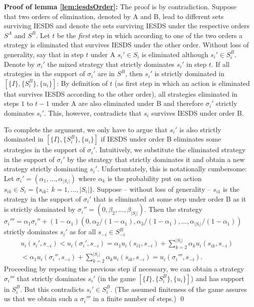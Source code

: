 \documentclass[a4paper,11pt]{article}
\begin{document}

\textbf{Proof of lemma \ref{lem:iesdsOrder}: }
The proof is by contradiction. Suppose that two orders of elimination, denoted by A and B, lead to different sets surviving IESDS and denote the sets surviving IESDS under the respective orders $S^A$ and $S^B$. Let $t$ be the \emph{first} step in which according to one of the two orders a strategy is eliminated that survives IESDS under the other order. Without loss of generality, say that in step $t$ under A $s_i'\in S_i$ is eliminated although $s_i'\in S_i^B$. Denote by $\sigma_i'$ the mixed strategy that strictly dominates $s_i'$ in step $t$. If all strategies in the support of $\sigma_i'$ are in $S^B$, then $s_i'$ is strictly dominated in $\left[\{I\},\{S_i^B\},\{u_i\}\right]$: By definition of $t$ (as first step in which an action is eliminated that survives IESDS according to the other order), all strategies eliminated in steps $1$ to $t-1$ under A are also eliminated under B and therefore $\sigma_i'$ strictly dominates $s_i'$. This, however, contradicts that $s_i$ survives IESDS under order B.

To complete the argument, we only have to argue that $s_i'$ is also strictly dominated in $\left[\{I\},\{S_i^B\},\{u_i\}\right]$ if IESDS under order B eliminates some strategies in the support of $\sigma_i'$. Intuitively, we substitute the eliminated strategy in the support of $\sigma_i'$ by the strategy that strictly dominates it and obtain a new strategy strictly dominating $s_i'$. Unfortuntately, this is notationally cumbersome: Let $\sigma_i'=(\alpha_1,\dots,\alpha_{|S_i|})$ where $\alpha_k$ is the probability put on action  $s_{ik}\in S_i=\{s_{ik}:\;k=1,\dots,|S_i|\}$. Suppose -- without loss of generality -- $s_{i1}$ is the strategy in the support of $\sigma_i'$ that is eliminated at some step under order B as it is strictly dominated by $\sigma_i''=(0,\beta_2,\dots,\beta_{|S_i|})$. Then the strategy $\sigma_i'''= \alpha_1 \sigma_i''+(1-\alpha_1) (0,\alpha_2/(1-\alpha_1),\alpha_3/(1-\alpha_1),\dots,\alpha_{|S_i|}/(1-\alpha_1))$ strictly dominates $s_i'$ as for all $s_{-i}\in S_{-i}^B$
\begin{multline*}
  u_i(s_i',s_{-i})<u_i(\sigma_i',s_{-i})=\alpha_1 u_i(s_{i1},s_{-i}) +\sum_{k=2}^{|S_i|}\alpha_k u_i(s_{ik},s_{-i})\\ <\alpha_1 u_i(\sigma_i'',s_{-i})+\sum_{k=2}^{|S_i|}\alpha_k u_i(s_{ik},s_{-i})=u_i(\sigma_i''',s_{-i}).
\end{multline*}
Proceeding by repeating the previous step if necessary, we can obtain a strategy $\sigma_i'''$ that strictly dominates $s_i'$ (in the game $\left[\{I\},\{S_i^B\},\{u_i\}\right]$) and has support in $S_i^B$. But this contradicts $s_i'\in S_i^B$. (The assumed finiteness of the game assures us that we obtain such a $\sigma_i'''$ in a finite number of steps.) \qed
\end{document}
